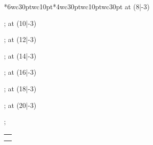 {\begin{center}
{\begin{minipage}{0.8\linewidth}
\begin{center}
\begin{NiceTabular}{*{6}{wc{30pt}wc{10pt}}*{4}{wc{30pt}wc{10pt}}wc{30pt}}
            \tikz\node[rotate=60] at (8|-3) {\begin{minipage}{60pt}\begin{center}\scriptsize \PfCNomUnites[4]\end{center}\end{minipage}};%
            \tikz\node[rotate=60] at (10|-3) {\begin{minipage}{60pt}\begin{center}\scriptsize \PfCNomUnites[5]\end{center}\end{minipage}};%
            \tikz\node[rotate=60] at (12|-3) {\begin{minipage}{60pt}\begin{center}\scriptsize \PfCNomUnites[6]\end{center}\end{minipage}};%
            \tikz\node[rotate=60] at (14|-3) {\begin{minipage}{60pt}\begin{center}\scriptsize \PfCNomUnites[7]\end{center}\end{minipage}};%
            \tikz\node[rotate=60] at (16|-3) {\begin{minipage}{60pt}\begin{center}\scriptsize \PfCNomUnites[8]\end{center}\end{minipage}};%
            \tikz\node[rotate=60] at (18|-3) {\begin{minipage}{60pt}\begin{center}\scriptsize \PfCNomUnites[9]\end{center}\end{minipage}};%
            \tikz\node[rotate=60] at (20|-3) {\begin{minipage}{60pt}\begin{center}\scriptsize \PfCNomUnites[10]\end{center}\end{minipage}};%
          \end{NiceTabular}%
        \end{center}%
        \setlength{\tabcolsep}{100\tabcolsep}%
      \end{minipage}%
    }%
  \end{center}
  \begin{center}
  \end{center}
}%